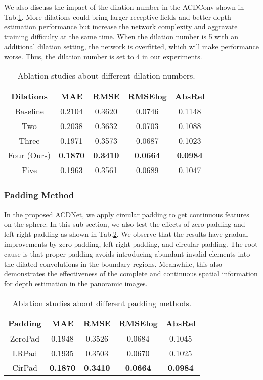 \documentclass[letterpaper]{article} \usepackage{aaai21}  \usepackage{times}  \usepackage{helvet} \usepackage{courier}  \usepackage[hyphens]{url}  \usepackage{graphicx} \urlstyle{rm} \def\UrlFont{\rm}  \usepackage{natbib}  \usepackage{caption} \frenchspacing  \setlength{\pdfpagewidth}{8.5in}  \setlength{\pdfpageheight}{11in}
\newcommand{\newchange}[1]{{\color{black}#1}}
\begin{document}
We also discuss the impact of the dilation number in the ACDConv shown in Tab.\ref{tab:abs-4}. More dilations could bring larger receptive fields and better depth estimation performance but increase the network complexity and aggravate training difficulty at the same time. 
When the dilation number is 5 with an additional  dilation setting, the network is overfitted, which will make performance worse.
Thus, the dilation number is set to 4 in our experiments.

\begin{table}[tb]
    \centering
\begin{tabular}{ccccc} 
\toprule 
Dilations & MAE & RMSE & RMSElog &  AbsRel \\
\midrule 
Baseline  & 0.2104 & 0.3620 & 0.0746 & 0.1148 \\
Two & 0.2038 & 0.3632 & 0.0703 & 0.1088 \\ Three & 0.1971 & 0.3573 & 0.0687 & 0.1023 \\ Four (Ours)  & \textbf{0.1870} & \textbf{0.3410} & \textbf{0.0664} & \textbf{0.0984} \\
Five & 0.1963 & 0.3561 & 0.0689 & 0.1047 \\ 
\bottomrule
    \end{tabular}
    \caption{Ablation studies about different dilation numbers.}
    \label{tab:abs-4}
\end{table}

\subsubsection{Padding Method}

In the proposed ACDNet, we apply circular padding to get continuous features on the sphere. In this sub-section, we also test the effects of zero padding and left-right padding as shown in Tab.\ref{tab:abs-3}. We observe that the results have gradual improvements by zero padding, left-right padding, and circular padding. 
\newchange{
The root cause is that proper padding avoids introducing abundant invalid elements into the dilated convolutions in the boundary regions.
}
Meanwhile, this also demonstrates the effectiveness of the complete and continuous spatial information for depth estimation in the panoramic images.

\begin{table}[tb]
    \centering
    \begin{tabular}{ccccc} 
\toprule 
Padding & MAE & RMSE & RMSElog &  AbsRel \\
\midrule 
ZeroPad & 0.1948 & 0.3526 & 0.0684 & 0.1045 \\
LRPad & 0.1935 & 0.3503 & 0.0670 & 0.1025 \\
CirPad & \textbf{0.1870} & \textbf{0.3410} & \textbf{0.0664} & \textbf{0.0984} \\
\bottomrule
    \end{tabular}
    \caption{Ablation studies about different padding methods.}
    \label{tab:abs-3}
\end{table}
\end{document}
